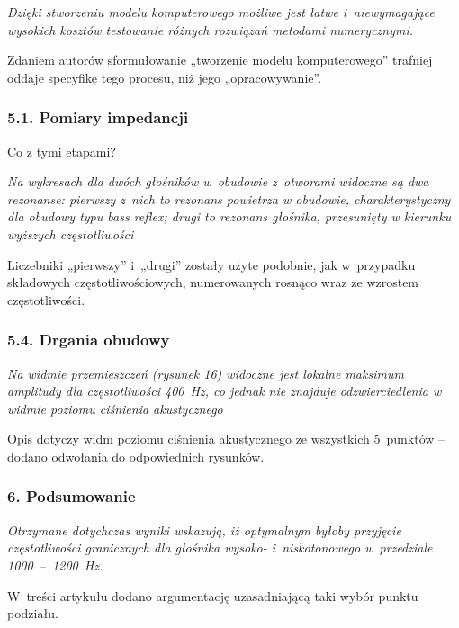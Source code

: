 \documentclass[12pt]{article}
\begin{document}
    \textit{Dzięki stworzeniu modelu komputerowego możliwe jest łatwe i~niewymagające wysokich kosztów testowanie różnych rozwiązań metodami numerycznymi.}
    
    Zdaniem autorów sformułowanie „tworzenie modelu komputerowego” trafniej oddaje specyfikę tego procesu, niż jego „opracowywanie”.
    
    \subsubsection*{5.1. Pomiary impedancji}
    
    Co z tymi etapami?
    
    \textit{Na wykresach dla dwóch głośników w~obudowie z~otworami widoczne są dwa rezonanse: pierwszy z~nich to rezonans powietrza w obudowie, charakterystyczny dla obudowy typu \emph{bass reflex}; drugi to rezonans głośnika, przesunięty w kierunku wyższych częstotliwości}
    
    Liczebniki „pierwszy” i~„drugi” zostały użyte podobnie, jak w~przypadku składowych częstotliwościowych, numerowanych rosnąco wraz ze wzrostem częstotliwości.
    
    \subsubsection*{5.4. Drgania obudowy}
    
    \textit{Na widmie przemieszczeń (rysunek 16) widoczne jest lokalne maksimum amplitudy dla częstotliwości 400~Hz, co jednak nie znajduje odzwierciedlenia w widmie poziomu ciśnienia akustycznego}
    
    Opis dotyczy widm poziomu ciśnienia akustycznego ze wszystkich 5~punktów -- dodano odwołania do odpowiednich rysunków.
    
    \subsubsection*{6. Podsumowanie}
    
    \textit{Otrzymane dotychczas wyniki wskazują, iż optymalnym byłoby przyjęcie częstotliwości granicznych dla głośnika wysoko- i~niskotonowego w~przedziale \num{1000}~--~\SI{1200}{\hertz}.}
    
    W~treści artykułu dodano argumentację uzasadniającą taki wybór punktu podziału.
    
    
\end{document}
